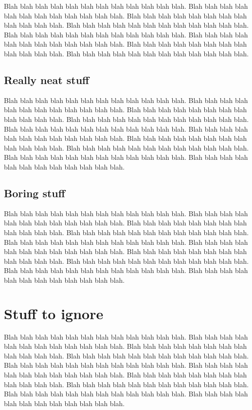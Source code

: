 Blah blah blah blah blah blah blah blah blah blah blah blah.
Blah blah blah blah blah blah blah blah blah blah blah blah.
Blah blah blah blah blah blah blah blah blah blah blah blah.
Blah blah blah blah blah blah blah blah blah blah blah blah.
Blah blah blah blah blah blah blah blah blah blah blah blah.
Blah blah blah blah blah blah blah blah blah blah blah blah.
Blah blah blah blah blah blah blah blah blah blah blah blah.
Blah blah blah blah blah blah blah blah blah blah blah blah.

\subsection{Really neat stuff}

Blah blah blah blah blah blah blah blah blah blah blah blah.
Blah blah blah blah blah blah blah blah blah blah blah blah.
Blah blah blah blah blah blah blah blah blah blah blah blah.
Blah blah blah blah blah blah blah blah blah blah blah blah.
Blah blah blah blah blah blah blah blah blah blah blah blah.
Blah blah blah blah blah blah blah blah blah blah blah blah.
Blah blah blah blah blah blah blah blah blah blah blah blah.
Blah blah blah blah blah blah blah blah blah blah blah blah.
Blah blah blah blah blah blah blah blah blah blah blah blah.
Blah blah blah blah blah blah blah blah blah blah blah blah.


\subsection{Boring stuff}

Blah blah blah blah blah blah blah blah blah blah blah blah.
Blah blah blah blah blah blah blah blah blah blah blah blah.
Blah blah blah blah blah blah blah blah blah blah blah blah.
Blah blah blah blah blah blah blah blah blah blah blah blah.
Blah blah blah blah blah blah blah blah blah blah blah blah.
Blah blah blah blah blah blah blah blah blah blah blah blah.
Blah blah blah blah blah blah blah blah blah blah blah blah.
Blah blah blah blah blah blah blah blah blah blah blah blah.
Blah blah blah blah blah blah blah blah blah blah blah blah.
Blah blah blah blah blah blah blah blah blah blah blah blah.

\section{Stuff to ignore}

Blah blah blah blah blah blah blah blah blah blah blah blah.
Blah blah blah blah blah blah blah blah blah blah blah blah.
Blah blah blah blah blah blah blah blah blah blah blah blah.
Blah blah blah blah blah blah blah blah blah blah blah blah.
Blah blah blah blah blah blah blah blah blah blah blah blah.
Blah blah blah blah blah blah blah blah blah blah blah blah.
Blah blah blah blah blah blah blah blah blah blah blah blah.
Blah blah blah blah blah blah blah blah blah blah blah blah.
Blah blah blah blah blah blah blah blah blah blah blah blah.
Blah blah blah blah blah blah blah blah blah blah blah blah.
